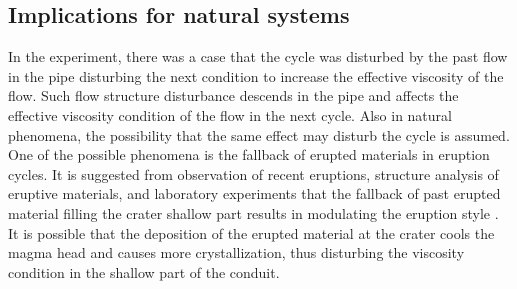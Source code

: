 \documentclass[aps,pre,preprint,groupedaddress,showkeys]{revtex4-2}
\begin{document}
\subsection{Implications for natural systems}
In the experiment, there was a case that the cycle was disturbed by the past flow in the pipe disturbing the next condition to increase the effective viscosity of the flow.
Such flow structure disturbance descends in the pipe and affects the effective viscosity condition of the flow in the next cycle.
Also in natural phenomena, the possibility that the same effect may disturb the cycle is assumed.
One of the possible phenomena is the fallback of erupted materials in eruption cycles.
It is suggested from observation of recent eruptions, structure analysis of eruptive materials, and laboratory experiments that the fallback of past erupted material filling the crater shallow part results in modulating the eruption style \citep{Patrick2007, Gurioli2014, DelBello2015a, Capponi2016}.
It is possible that the deposition of the erupted material at the crater cools the magma head and causes more crystallization, thus disturbing the viscosity condition in the shallow part of the conduit.
\end{document}
